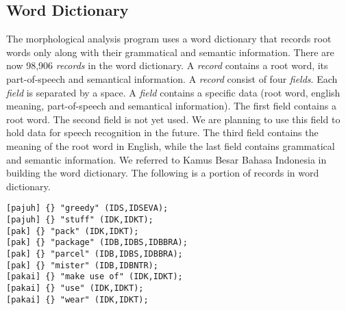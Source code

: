 \documentclass[english]{nlp}
\begin{document}
\subsection{Word Dictionary}
The morphological analysis program uses a word dictionary that 
records root words only along with their grammatical and semantic 
information. There are now 98,906 {\it records} in the word dictionary.
A {\it record} contains a root word, its part-of-speech and semantical information.
A {\it record} consist of four {\it fields}. Each {\it field} is separated by
a space.
A {\it field} contains a specific data (root word, english meaning, part-of-speech
and semantical information).
The first field contains a root word.
The second field is not yet used. We are planning to use this field
to hold data for speech recognition in the future. 
The third field contains the meaning of the root word in English, while
the last field contains grammatical and semantic information.
We referred to Kamus Besar Bahasa Indonesia \cite{Moeliono99} in 
building the word dictionary.
The following is a portion of records in word dictionary.
\begin{verbatim}
[pajuh] {} "greedy" (IDS,IDSEVA);
[pajuh] {} "stuff" (IDK,IDKT);
[pak] {} "pack" (IDK,IDKT);
[pak] {} "package" (IDB,IDBS,IDBBRA);
[pak] {} "parcel" (IDB,IDBS,IDBBRA);
[pak] {} "mister" (IDB,IDBNTR);
[pakai] {} "make use of" (IDK,IDKT);
[pakai] {} "use" (IDK,IDKT);
[pakai] {} "wear" (IDK,IDKT);
\end{verbatim}
\end{document}

